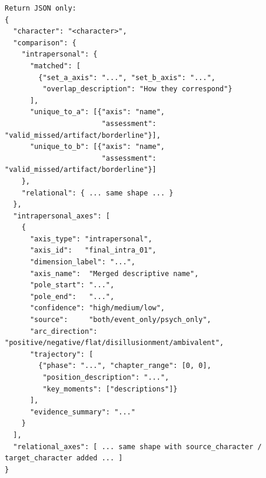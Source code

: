 \documentclass[11pt]{article}
\begin{document}
\begin{table}[htbp]
\begin{lstlisting}[basicstyle=\ttfamily\scriptsize]
Return JSON only:
{
  "character": "<character>",
  "comparison": {
    "intrapersonal": {
      "matched": [
        {"set_a_axis": "...", "set_b_axis": "...",
         "overlap_description": "How they correspond"}
      ],
      "unique_to_a": [{"axis": "name",
                       "assessment": "valid_missed/artifact/borderline"}],
      "unique_to_b": [{"axis": "name",
                       "assessment": "valid_missed/artifact/borderline"}]
    },
    "relational": { ... same shape ... }
  },
  "intrapersonal_axes": [
    {
      "axis_type": "intrapersonal",
      "axis_id":   "final_intra_01",
      "dimension_label": "...",
      "axis_name":  "Merged descriptive name",
      "pole_start": "...",
      "pole_end":   "...",
      "confidence": "high/medium/low",
      "source":     "both/event_only/psych_only",
      "arc_direction": "positive/negative/flat/disillusionment/ambivalent",
      "trajectory": [
        {"phase": "...", "chapter_range": [0, 0],
         "position_description": "...",
         "key_moments": ["descriptions"]}
      ],
      "evidence_summary": "..."
    }
  ],
  "relational_axes": [ ... same shape with source_character / target_character added ... ]
}
\end{lstlisting}
\end{table}
\end{document}
